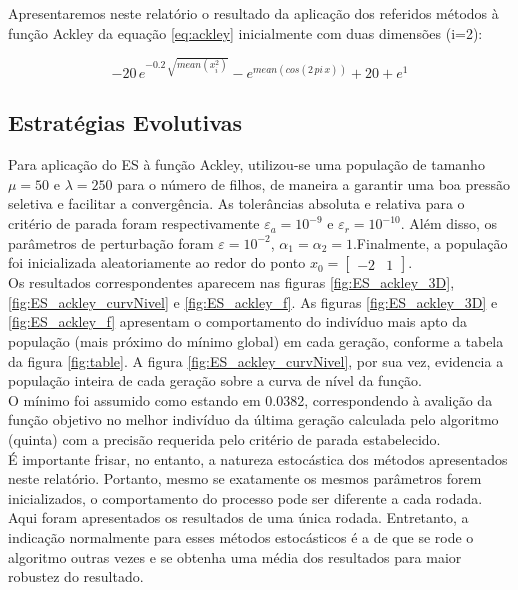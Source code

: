 \documentclass[conference,compsoc]{IEEEtran}
\begin{document}
Apresentaremos neste relatório o resultado da aplicação dos referidos métodos à função Ackley da equação \ref{eq:ackley} inicialmente com duas dimensões (i=2):

 \begin{equation}
 -20\,e^{-0.2\, \sqrt{mean(x_i^2)}} - e^{mean(cos(2\,pi\,x))} + 20 + e^{1}
 \label{eq:ackley}
 \end{equation} 

\subsection{Estratégias Evolutivas}

Para aplicação do ES à função Ackley, utilizou-se uma população de tamanho $\mu=50$ e $\lambda=250$ para o número de filhos, de maneira a garantir uma boa pressão seletiva e facilitar a convergência. As tolerâncias absoluta e relativa para o critério de parada foram respectivamente $\varepsilon_a=10^{-9}$ e $\varepsilon_r=10^{-10}$. Além disso, os parâmetros de perturbação foram $\varepsilon=10^{-2}$, $\alpha_1=\alpha_2=1$.Finalmente, a população foi inicializada aleatoriamente ao redor do ponto $x_0 = \begin{bmatrix}-2 &1\end{bmatrix}.$\\

Os resultados correspondentes aparecem nas figuras \ref{fig:ES_ackley_3D},\ref{fig:ES_ackley_curvNivel} e \ref{fig:ES_ackley_f}. As figuras  \ref{fig:ES_ackley_3D} e \ref{fig:ES_ackley_f} apresentam o comportamento do indivíduo mais apto da população (mais próximo do mínimo global) em cada geração, conforme a tabela da figura \ref{fig:table}. A figura \ref{fig:ES_ackley_curvNivel}, por sua vez, evidencia a população inteira de cada geração sobre a curva de nível da função.\\

O mínimo foi assumido como estando em 0.0382, correspondendo à avalição da função objetivo no melhor indivíduo da última geração calculada pelo algoritmo (quinta) com a precisão requerida pelo critério de parada estabelecido.\\

É importante frisar, no entanto, a natureza estocástica dos métodos apresentados neste relatório. Portanto, mesmo se exatamente os mesmos parâmetros forem inicializados, o comportamento do processo pode ser diferente a cada rodada. Aqui foram apresentados os resultados de uma única rodada. Entretanto, a indicação normalmente para esses métodos estocásticos é a de que se rode o algoritmo outras vezes e se obtenha uma média dos resultados para maior robustez do resultado.
\end{document}
